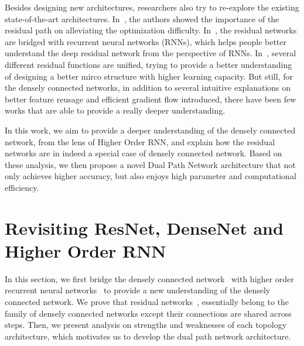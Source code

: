 \documentclass{article}
\begin{document}
Besides designing new architectures, researchers also try to re-explore the existing state-of-the-art architectures. In~\citep{he2016identity}, the authors showed the importance of the residual path on alleviating the optimization difficulty. In~\citep{liao2016bridging}, the residual networks are bridged with recurrent neural networks (RNNs), which helps people better understand the deep residual network from the perspective of RNNs. In~\citep{ypChen2017}, several different residual functions are unified, trying to provide a better understanding of designing a better mirco structure with higher learning capacity. But still, for the densely connected networks, in addition to several intuitive explanations on better feature reusage and efficient gradient flow introduced, there have been few works that are able to provide a really deeper understanding.


In this work, we aim to provide a deeper understanding of the densely connected network, from the lens of Higher Order RNN, and explain how the residual networks are in indeed a special case of densely connected network. Based on these analysis, we then propose a novel Dual Path Network architecture that not only achieves higher accuracy, but also enjoys high parameter and computational efficiency.




% 
%
%
%

\section{Revisiting ResNet, DenseNet and Higher Order RNN}

In this section, we first bridge the densely connected network~\citep{huang2016densely} with higher order recurrent neural networks~\citep{soltani2016higher} to provide a new understanding of the densely connected network. We prove that residual networks~\citep{he2016deep,he2016identity,zagoruyko2016wide,xie2016aggregated,ypChen2017}, essentially belong to the family of densely connected networks except their connections are shared across steps. Then, we present analysis on strengths and weaknesses of each topology architecture, which motivates us to develop the dual path network architecture.
\end{document}
